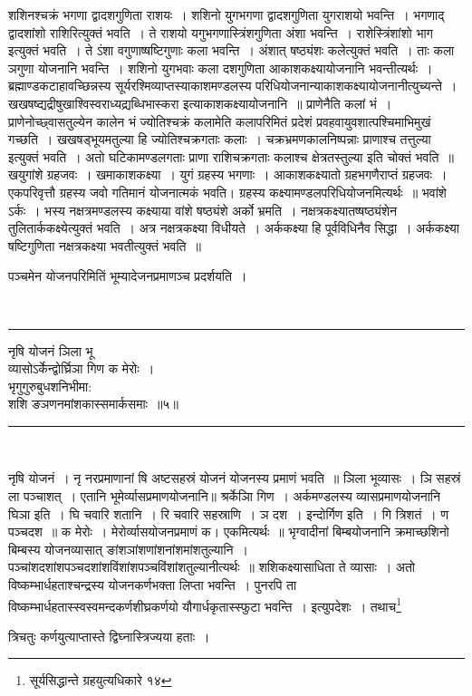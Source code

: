 \documentclass[12pt,a4paper]{report}
\newenvironment{moola}
{
~\\
\hrule
\begin{center}
\begin{LARGE}
}
{
\end{LARGE}
\end{center}
\hrule
~\\
}
\begin{document}
शशिनश्चक्रं भगणा द्वादशगुणिता राशयः~। शशिनो युगभगणा द्वादशगुणिता युगराशयो भवन्ति~। भगणाद् द्वादशांशो राशिरित्युक्तं भवति~। ते राशयो यगुभगणास्त्रिंशगुणिता अंशा भवन्ति~। राशेस्त्रिंशांशो भाग इत्युक्तं भवति~। ते ऽंशा वगुणाष्षष्टिगुणाः कला भवन्ति~। अंशात् षष्ठ्यंशः कलेत्युक्तं भवति~। ताः कला ञगुणा योजनानि भवन्ति~। शशिनो युगभवाः कला दशगुणिता आकाशकक्ष्यायोजनानि भवन्तीत्यर्थः~। ब्रह्माण्डकटाहावच्छिन्नस्य सूर्यरश्मिव्याप्तस्याकाशमण्डलस्य परिधियोजनान्याकाशकक्ष्यायोजनानीत्युच्यन्ते~। खखषष्द्यद्रीषुखाश्विस्वराध्यद्य्रब्धिभास्करा इत्याकाशकक्ष्यायोजनानि~॥ प्राणेनैति कलां भं~। प्राणेनोच्छ्वासतुल्येन कालेन भं ज्योतिश्चक्रं कलामेति कलापरिमितं प्रदेशं प्रवहवायुवशात्पश्चिमाभिमुखं गच्छति~। खखषड्भूयमतुल्या हि ज्योतिश्चक्रगताः कलाः~। चक्रभ्रमणकालनिष्पन्नाः प्राणाश्च तत्तुल्या इत्युक्तं भवति~। अतो घटिकामण्डलगताः प्राणा राशिचक्रगताः कलाश्च क्षेत्रतस्तुल्या इति चोक्तं भवति~॥ खयुगांशे ग्रहजवः~। खमाकाशकक्ष्या~। युगं ग्रहस्य भगणाः~। आकाशकक्ष्यातो ग्रहभगणैराप्तं ग्रहजवः~। एकपरिवृत्तौ ग्रहस्य जवो गतिमानं योजनात्मकं भवति। ग्रहस्य कक्ष्यामण्डलपरिधियोजनमित्यर्थः~॥ भवांशे ऽर्कः~। भस्य नक्षत्रमण्डलस्य कक्ष्याया वांशे षष्ठ्यंशे अर्को भ्रमति~। नक्षत्रकक्ष्यातष्षष्ठ्यंशेन तुलितार्ककक्ष्येत्युक्तं भवति~। अत्र नक्षत्रकक्ष्या विधीयते~। अर्ककक्ष्या हि पूर्वविधिनैव सिद्धा~। अर्ककक्ष्या षष्टिगुणिता नक्षत्रकक्ष्या भवतीत्युक्तं भवति~॥

पञ्चमेन योजनपरिमितिं भूम्यादेजनप्रमाणञ्च प्रदर्शयति~।

\begin{moola}
नृषि योजनं ञिला भू \\
व्यासोऽर्केन्द्वोर्घ्रिञा गिण क मेरोः~। \\
भृगुगुरुबुधशनिभीमा: \\
शशि ङञणनमांशकास्समार्कसमाः~॥५॥
\end{moola}

नृषि योजनं~। नृ नरप्रमाणानां षि अष्टसहस्रं योजनं योजनस्य प्रमाणं भवति~॥ ञिला भूव्यासः~। ञि सहस्रं ला पञ्चाशत्~। एतानि भूमेर्व्यासप्रमाणयोजनानि॥ श्रर्केञिा गिण~। अर्कमण्डलस्य व्यासप्रमाणयोजनानि घिञा इति~। घि चवारि शतानि~। रि चवारि सहस्राणि~। ञ दश~। इन्दोर्गिण इति~। गि त्रिशतं~। ण पञ्चदश~॥ क मेरोः~। मेरोर्व्यासयोजनप्रमाणं क। एकमित्यर्थः~॥ भृग्वादीनां बिम्बयोजनानि क्रमाच्छशिनो बिम्बस्य योजनव्यासात् ङांशञांशणांशनांशमांशतुल्यानि~। पञ्चांशदशांशपञ्चदशांशविंशांशपञ्चविंशांशतुल्यानीत्यर्थः~॥ शशिकक्ष्यासाधिता ते व्यासाः~। अतो विष्कम्भार्धहताश्चन्द्रस्य योजनकर्णभक्ता लिप्ता भवन्ति~। पुनरपि ता विष्कम्भार्धहतास्स्वस्वमन्दकर्णशीघ्रकर्णयो यौगार्धकृतास्स्फुटा भवन्ति~। इत्युपदेशः~। तथाच\footnote{सूर्यसिद्धान्ते ग्रहयुत्यधिकारे १४}

\begin{center}
 \begin{large}
त्रिचतुः कर्णयुत्याप्तास्ते द्विघ्नास्त्रिज्यया हताः~।
\end{large}
\end{center}
\end{document}
